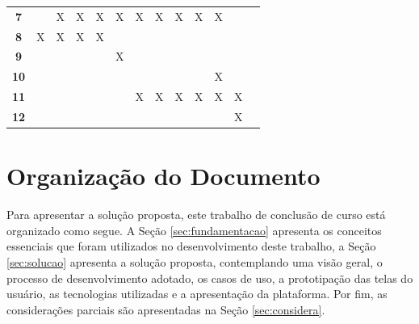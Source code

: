 \begin{table}[h!]
\begin{center}
\begin{small}
\begin{tabular}{ccccccccccccc}
  \textbf{7}                                               &            &    X        &      X      &     X       &    X        &    X        &        X                &  X           &     X        &    X           &     \\
	\textbf{8}                                               &      X      &     X       &      X      &     X       &            &            &                        &             &             &               &     \\
	\textbf{9}                                               &            &            &            &            &    X        &            &                        &             &             &               &     \\
	\textbf{10}                                               &            &            &            &            &            &            &                        &             &             &         X      &     \\
	\textbf{11}                                               &            &            &            &            &            &      X     &            X            &     X        &    X         &     X          &  X   \\
	\textbf{12}                                               &            &            &            &            &            &           &                        &             &             &               &  X   \\
  \bottomrule
\end{tabular}
\end{small}
\end{center}
\end{table}

\section{Organização do Documento}

Para apresentar a solução proposta, este trabalho de conclusão de curso está organizado como segue. A Seção \ref{sec:fundamentacao} apresenta os conceitos essenciais que foram utilizados no desenvolvimento deste trabalho, a Seção \ref{sec:solucao} apresenta a solução proposta, contemplando uma visão geral, o processo de desenvolvimento adotado, os casos de uso, a prototipação das telas do usuário, as tecnologias utilizadas e a apresentação da plataforma. Por fim, as considerações parciais são apresentadas na Seção \ref{sec:considera}.